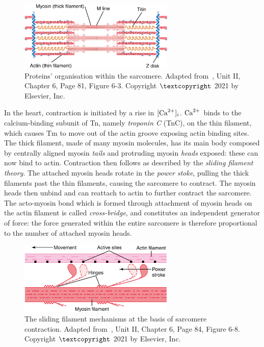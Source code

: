 \begin{figure}[!ht]
    \myfloatalign
    \includegraphics[width=0.66\textwidth]{figures/chapter01/fig_elsv_5.png}
    \caption{Proteins' organisation within the sarcomere. Adapted from~\cite{Guyton:2021}, Unit II, Chapter 6, Page 81, Figure 6-3. Copyright $\textcopyright$ 2021 by Elsevier, Inc.}
    \label{fig:my_label3}
\end{figure}

\vspace{0.2cm}
In the heart, contraction is initiated by a rise in $[\textrm{Ca}^{2+}]_{i}$. $\textrm{Ca}^{2+}$ binds to the calcium-binding subunit of Tn, namely \textit{troponin C} (\acs{TnC}), on the thin filament, which causes Tm to move out of the actin groove exposing actin binding sites. The thick filament, made of many myosin molecules, has its main body composed by centrally aligned myosin \textit{tails} and protruding myosin \textit{heads} exposed: these can now bind to actin. Contraction then follows as described by the \textit{sliding filament theory}. The attached myosin heads rotate in the \textit{power stoke}, pulling the thick filaments past the thin filaments, causing the sarcomere to contract. The myosin heads then unbind and can reattach to actin to further contract the sarcomere. The acto-myosin bond which is formed through attachment of myosin heads on the actin filament is called \textit{cross-bridge}, and constitutes an independent generator of force: the force generated within the entire sarcomere is therefore proportional to the number of attached myosin heads. 

\begin{figure}[!ht]
    \myfloatalign
    \includegraphics[width=0.66\textwidth]{figures/chapter01/fig_elsv_10.png}
    \caption{The sliding filament mechanisms at the basis of sarcomere contraction. Adapted from~\cite{Guyton:2021}, Unit II, Chapter 6, Page 84, Figure 6-8. Copyright $\textcopyright$ 2021 by Elsevier, Inc.}
    \label{fig:powerstroke}
\end{figure}


